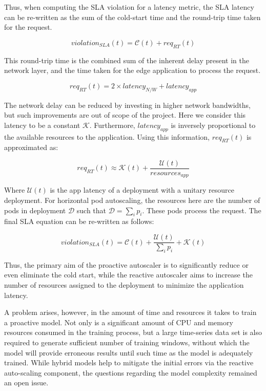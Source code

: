 Thus, when computing the SLA violation for a latency metric, the SLA latency can be re-written as the sum of the cold-start time and the round-trip time taken for the request.

\[ violation_{SLA}(t) = \mathcal{C}(t) + req_{RT}(t)\]

This round-trip time is the combined sum of the inherent delay present in the network layer, and the time taken for the edge application to process the request.

\[ req_{RT}(t) = 2 \times latency_{N/W} + latency_{app} \]

The network delay can be reduced by investing in higher network bandwidths, but such improvements are out of scope of the project. Here we consider this latency to be a constant $\mathcal{K}$. Furthermore, $latency_{app}$ is inversely proportional to the available resources to the application. Using this information, $req_{RT}(t)$ is approximated as:

\[ req_{RT}(t) \approx \mathcal{K}(t) + \frac{\mathcal{U}(t)}{resources_{app}} \]

Where $\mathcal{U}(t)$ is the app latency of a deployment with a unitary resource deployment. For horizontal pod autoscaling, the resources here are the number of pods in deployment $\mathcal{D}$ such that $\mathcal{D} = \sum_{i} p_{i}$. These pods process the request. The final SLA equation can be re-written as follows:

\[ violation_{SLA}(t) = \mathcal{C}(t) + \frac{\mathcal{U}(t)}{\sum_{i} p_{i}} + \mathcal{K}(t)\]

Thus, the primary aim of the proactive autoscaler is to significantly reduce or even eliminate the cold start, while the reactive autoscaler aims to increase the number of resources assigned to the deployment to minimize the application latency.\par

A problem arises, however, in the amount of time and resources it takes to train a proactive model. Not only is a significant amount of CPU and memory resources consumed in the training process, but a large time-series data set is also required to generate sufficient number of training windows, without which the model will provide erroneous results until such time as the model is adequately trained. While hybrid models help to mitigate the initial errors via the reactive auto-scaling component, the questions regarding the model complexity remained an open issue.\par

